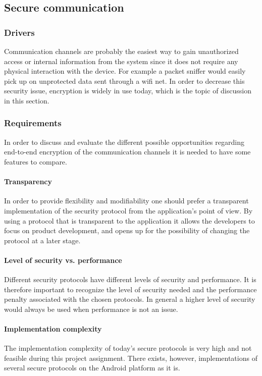 \subsection{Secure communication}

\subsubsection{Drivers}
Communication channels are probably the easiest way to gain unauthorized access or internal information from the system since it does not require any physical interaction with the device.  For example a packet sniffer would easily pick up on unprotected data sent through a wifi net. In order to decrease this security issue, encryption is widely in use today, which is the topic of discussion in this section.

\subsubsection{Requirements}
In order to discuss and evaluate the different possible opportunities regarding end-to-end encryption of the communication channels it is needed to have some features to compare.

\paragraph{Transparency}
In order to provide flexibility and modifiability one should prefer a transparent implementation of the security protocol from the application's point of view. By using a protocol that is transparent to the application it allows the developers to focus on product development, and opens up for the possibility of changing the protocol at a later stage.

\paragraph{Level of security vs. performance}
Different security protocols have different levels of security and performance. It is therefore important to recognize the level of security needed and the performance penalty associated with the chosen protocols. In general a higher level of security would always be used when performance is not an issue.

\paragraph{Implementation complexity}
The implementation complexity of today's secure protocols is very high and not feasible during this project assignment. There exists, however, implementations of several secure protocols on the Android platform as it is. 

